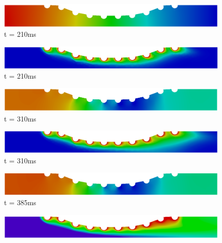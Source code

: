 \documentclass[10pt,fleqn,a4paper,twoside]{article}
\begin{document}
\begin{figure}[H]
\widefigure
     \begin{minipage}{.45\linewidth}
      \centering
      \includegraphics[scale=0.17]{./figure/pressure1.png}\\
      t = 210ms
     \end{minipage}%
     \begin{minipage}{.45\linewidth}
      \centering
      \includegraphics[scale=0.17]{./figure/concentration1.png}\\
      t = 210ms
     \end{minipage}
     \begin{minipage}{.45\linewidth}
     \medskip
      \centering
      \includegraphics[scale=0.17]{./figure/pressure2.png}\\
      t = 310ms
     \end{minipage}%
     \begin{minipage}{.45\linewidth}
     \medskip
      \centering
      \includegraphics[scale=0.17]{./figure/concentration2.png}\\
      t = 310ms
     \end{minipage}
     \begin{minipage}{.45\linewidth}
      \centering
      \includegraphics[scale=0.17]{./figure/pressure3.png}\\
      t = 385ms
     \end{minipage}%
     \begin{minipage}{.45\linewidth}
      \centering
      \includegraphics[scale=0.17]{./figure/concentration3.png}\\

\end{minipage}
\end{figure}
\end{document}
